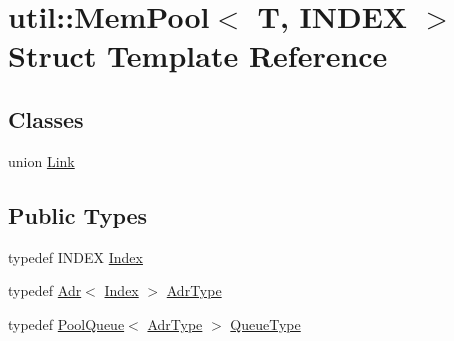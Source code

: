 \hypertarget{structutil_1_1MemPool}{\section{util\-:\-:Mem\-Pool$<$ T, I\-N\-D\-E\-X $>$ Struct Template Reference}
\label{structutil_1_1MemPool}
}
\subsection*{Classes}
\begin{DoxyCompactItemize}
\item 
union \hyperlink{unionutil_1_1MemPool_1_1Link}{Link}
\end{DoxyCompactItemize}
\subsection*{Public Types}
\begin{DoxyCompactItemize}
\item 
typedef I\-N\-D\-E\-X \hyperlink{structutil_1_1MemPool_abad76ce984ee05501d88426b5641e5c2}{Index}
\item 
typedef \hyperlink{structutil_1_1Adr}{Adr}$<$ \hyperlink{structutil_1_1MemPool_abad76ce984ee05501d88426b5641e5c2}{Index} $>$ \hyperlink{structutil_1_1MemPool_ace5e7994507896fbdb4e188e3886e73d}{Adr\-Type}
\item 
typedef \hyperlink{structutil_1_1PoolQueue}{Pool\-Queue}$<$ \hyperlink{structutil_1_1MemPool_ace5e7994507896fbdb4e188e3886e73d}{Adr\-Type} $>$ \hyperlink{structutil_1_1MemPool_a354adf83f470881d3839a19f9589aad9}{Queue\-Type}
\end{DoxyCompactItemize}

